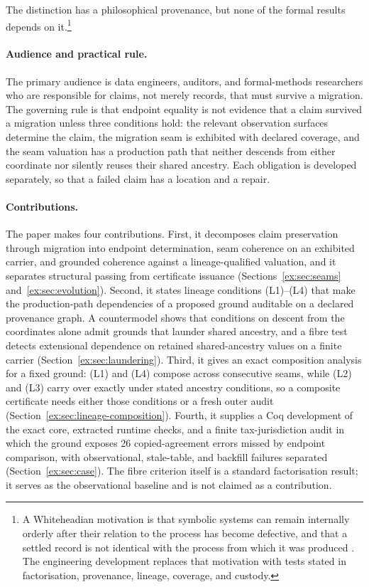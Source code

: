\documentclass[smallextended,envcountsect,envcountsame,natbib]{svjour3}
\begin{document}
The distinction has a philosophical provenance, but none of the formal results depends on it.\footnote{A Whiteheadian motivation is that symbolic systems can remain internally orderly after their relation to the process has become defective, and that a settled record is not identical with the process from which it was produced \citep{whitehead1927symbolism,whitehead1929}. The engineering development replaces that motivation with tests stated in factorisation, provenance, lineage, coverage, and custody.}

\paragraph{Audience and practical rule.} The primary audience is data engineers, auditors, and formal-methods researchers who are responsible for claims, not merely records, that must survive a migration. The governing rule is that endpoint equality is not evidence that a claim survived a migration unless three conditions hold: the relevant observation surfaces determine the claim, the migration seam is exhibited with declared coverage, and the seam valuation has a production path that neither descends from either coordinate nor silently reuses their shared ancestry. Each obligation is developed separately, so that a failed claim has a location and a repair.

\paragraph{Contributions.} The paper makes four contributions. First, it decomposes claim preservation through migration into endpoint determination, seam coherence on an exhibited carrier, and grounded coherence against a lineage-qualified valuation, and it separates structural passing from certificate issuance (Sections~\ref{ex:sec:seams} and~\ref{ex:sec:evolution}). Second, it states lineage conditions (L1)--(L4) that make the production-path dependencies of a proposed ground auditable on a declared provenance graph. A countermodel shows that conditions on descent from the coordinates alone admit grounds that launder shared ancestry, and a fibre test detects extensional dependence on retained shared-ancestry values on a finite carrier (Section~\ref{ex:sec:laundering}). Third, it gives an exact composition analysis for a fixed ground: (L1) and (L4) compose across consecutive seams, while (L2) and (L3) carry over exactly under stated ancestry conditions, so a composite certificate needs either those conditions or a fresh outer audit (Section~\ref{ex:sec:lineage-composition}). Fourth, it supplies a Coq development of the exact core, extracted runtime checks, and a finite tax-jurisdiction audit in which the ground exposes 26 copied-agreement errors missed by endpoint comparison, with observational, stale-table, and backfill failures separated (Section~\ref{ex:sec:case}). The fibre criterion itself is a standard factorisation result; it serves as the observational baseline and is not claimed as a contribution.
\end{document}
